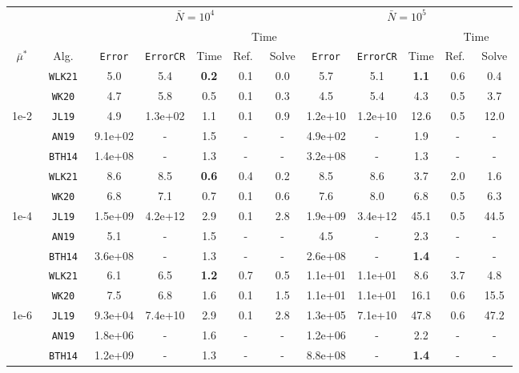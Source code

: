 \begin{tabular}{ccccccc|ccccc}%
\toprule
& & \multicolumn{5}{c}{$\bar N = 10^4$} & \multicolumn{5}{c}{$\bar N = 10^5$} \\
\cmidrule(lr){3-7} \cmidrule(lr){8-12}
& & & & & \multicolumn{2}{c}{Time} & & & & \multicolumn{2}{c}{Time} \\
\cmidrule(lr){6-7} \cmidrule(lr){11-12}
$\bar\mu^*$   & Alg.        & \texttt{Error} & \texttt{ErrorCR} & Time      & Ref.\ & Solve & \texttt{Error} & \texttt{ErrorCR} & Time     & Ref.\  & Solve \\
\midrule
& \texttt{ WLK21 }&  5.0&  5.4& \textbf{ 0.2 }&  0.1&  0.0&  5.7&  5.1& \textbf{ 1.1 }&  0.6&  0.4 \\
& \texttt{ WK20 }&  4.7&  5.8&  0.5&  0.1&  0.3&  4.5&  5.4&  4.3&  0.5&  3.7 \\
1e-2& \texttt{ JL19 }&  4.9&  1.3e+02&  1.1&  0.1&  0.9&  1.2e+10&  1.2e+10&  12.6&  0.5&  12.0 \\
& \texttt{ AN19 }&  9.1e+02& -&  1.5& -& -&  4.9e+02& -&  1.9& -& - \\
& \texttt{ BTH14 }&  1.4e+08& -&  1.3& -& -&  3.2e+08& -&  1.3& -& - \\
\midrule
& \texttt{ WLK21 }&  8.6&  8.5& \textbf{ 0.6 }&  0.4&  0.2&  8.5&  8.6&  3.7&  2.0&  1.6 \\
& \texttt{ WK20 }&  6.8&  7.1&  0.7&  0.1&  0.6&  7.6&  8.0&  6.8&  0.5&  6.3 \\
1e-4& \texttt{ JL19 }&  1.5e+09&  4.2e+12&  2.9&  0.1&  2.8&  1.9e+09&  3.4e+12&  45.1&  0.5&  44.5 \\
& \texttt{ AN19 }&  5.1& -&  1.5& -& -&  4.5& -&  2.3& -& - \\
& \texttt{ BTH14 }&  3.6e+08& -&  1.3& -& -&  2.6e+08& -& \textbf{ 1.4 }& -& - \\
\midrule
& \texttt{ WLK21 }&  6.1&  6.5& \textbf{ 1.2 }&  0.7&  0.5&  1.1e+01&  1.1e+01&  8.6&  3.7&  4.8 \\
& \texttt{ WK20 }&  7.5&  6.8&  1.6&  0.1&  1.5&  1.1e+01&  1.1e+01&  16.1&  0.6&  15.5 \\
1e-6& \texttt{ JL19 }&  9.3e+04&  7.4e+10&  2.9&  0.1&  2.8&  1.3e+05&  7.1e+10&  47.8&  0.6&  47.2 \\
& \texttt{ AN19 }&  1.8e+06& -&  1.6& -& -&  1.2e+06& -&  2.2& -& - \\
& \texttt{ BTH14 }&  1.2e+09& -&  1.3& -& -&  8.8e+08& -& \textbf{ 1.4 }& -& - \\
\bottomrule
\end{tabular}
